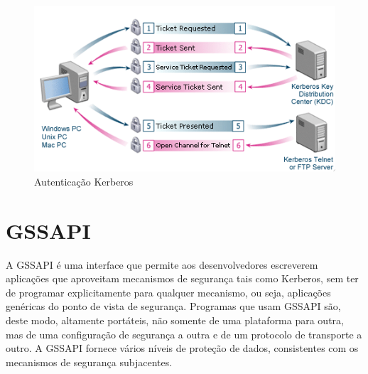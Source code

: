  
\begin{figure}[ht]
   	\centering
    \includegraphics[width=0.9 \textwidth]{figuras/kerberos} 
   	\caption{Autenticação Kerberos \cite{KERBEROS}}
    \label{kerberos}
\end{figure}

\section{GSSAPI}

A GSSAPI é uma interface que permite aos desenvolvedores escreverem aplicações que aproveitam mecanismos de segurança tais como Kerberos, sem ter de programar explicitamente para qualquer mecanismo, ou seja, aplicações genéricas do ponto de vista de segurança. Programas que usam GSSAPI são, deste modo, altamente portáteis, não somente de uma plataforma para outra, mas de uma configuração de segurança a outra e de um protocolo de transporte a outro. A GSSAPI fornece vários níveis de proteção de dados, consistentes com os mecanismos de segurança subjacentes.\cite{HUGO}